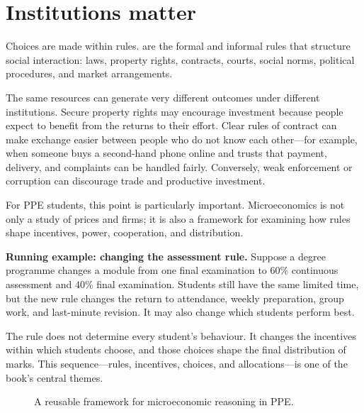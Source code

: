 \section{Institutions matter}

Choices are made within rules.  are the formal and informal rules that structure social interaction: laws, property rights, contracts, courts, social norms, political procedures, and market arrangements.

The same resources can generate very different outcomes under different
institutions. Secure property rights may encourage investment because people
expect to benefit from the returns to their effort. Clear rules of contract
can make exchange easier between people who do not know each other---for
example, when someone buys a second-hand phone online and trusts that payment,
delivery, and complaints can be handled fairly. Conversely, weak enforcement
or corruption can discourage trade and productive investment.

For PPE students, this point is particularly important. Microeconomics is not only a study of prices and firms; it is also a framework for examining how rules shape incentives, power, cooperation, and distribution.

\begin{exercisebox}
\textbf{Running example: changing the assessment rule.} Suppose a degree programme changes a module from one final examination to $60\%$ continuous assessment and $40\%$ final examination. Students still have the same limited time, but the new rule changes the return to attendance, weekly preparation, group work, and last-minute revision. It may also change which students perform best.

The rule does not determine every student's behaviour. It changes the incentives within which students choose, and those choices shape the final distribution of marks. This sequence---rules, incentives, choices, and allocations---is one of the book's central themes.
\end{exercisebox}

\begin{figure}[htbp]
  \centering
  \caption{A reusable framework for microeconomic reasoning in PPE.}
  \label{fig:economic-lens}
\end{figure}

